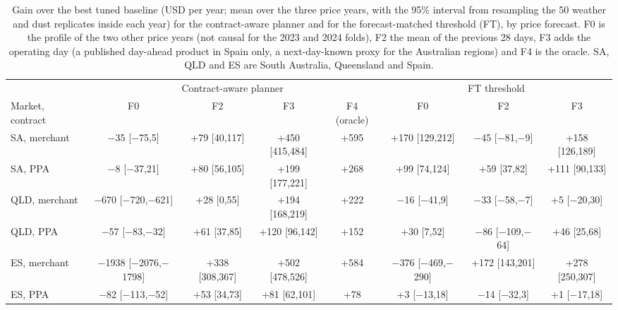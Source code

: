 \begin{table}[!t]
\centering
\caption{Gain over the best tuned baseline (USD per year; mean over the three price years, with the 95\% interval from resampling the 50 weather and dust replicates inside each year) for the contract-aware planner and for the forecast-matched threshold (FT), by price forecast. F0 is the profile of the two other price years (not causal for the 2023 and 2024 folds), F2 the mean of the previous 28 days, F3 adds the operating day (a published day-ahead product in Spain only, a next-day-known proxy for the Australian regions) and F4 is the oracle. SA, QLD and ES are South Australia, Queensland and Spain.}
\label{tab:fore}
\scriptsize
\setlength{\tabcolsep}{2.2pt}
\begin{tabular}{lccccccc}
\toprule
 & \multicolumn{4}{c}{Contract-aware planner} & \multicolumn{3}{c}{FT threshold} \\ \cmidrule(lr){2-5}\cmidrule(lr){6-8}
Market, contract & F0 & F2 & F3 & F4 (oracle) & F0 & F2 & F3 \\
\midrule
SA, merchant & $-$35 [$-$75,5] & +79 [40,117] & +450 [415,484] & +595 & +170 [129,212] & $-$45 [$-$81,$-$9] & +158 [126,189] \\
SA, PPA & $-$8 [$-$37,21] & +80 [56,105] & +199 [177,221] & +268 & +99 [74,124] & +59 [37,82] & +111 [90,133] \\
QLD, merchant & $-$670 [$-$720,$-$621] & +28 [0,55] & +194 [168,219] & +222 & $-$16 [$-$41,9] & $-$33 [$-$58,$-$7] & +5 [$-$20,30] \\
QLD, PPA & $-$57 [$-$83,$-$32] & +61 [37,85] & +120 [96,142] & +152 & +30 [7,52] & $-$86 [$-$109,$-$64] & +46 [25,68] \\
ES, merchant & $-$1938 [$-$2076,$-$1798] & +338 [308,367] & +502 [478,526] & +584 & $-$376 [$-$469,$-$290] & +172 [143,201] & +278 [250,307] \\
ES, PPA & $-$82 [$-$113,$-$52] & +53 [34,73] & +81 [62,101] & +78 & +3 [$-$13,18] & $-$14 [$-$32,3] & +1 [$-$17,18] \\
\bottomrule
\end{tabular}
\end{table}
